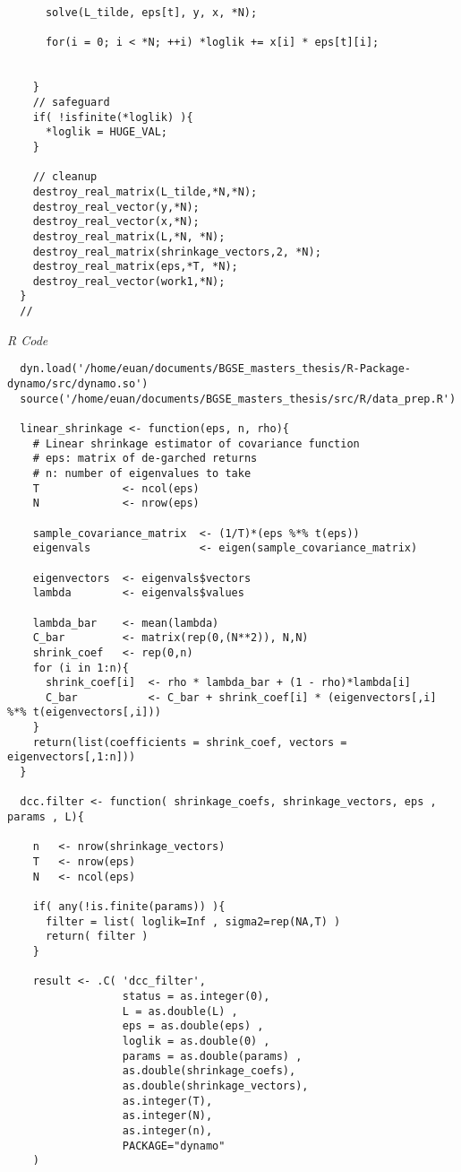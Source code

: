 \begin{lstlisting}
      solve(L_tilde, eps[t], y, x, *N);

      for(i = 0; i < *N; ++i) *loglik += x[i] * eps[t][i];


    }
    // safeguard
    if( !isfinite(*loglik) ){
      *loglik = HUGE_VAL;
    }

    // cleanup
    destroy_real_matrix(L_tilde,*N,*N);
    destroy_real_vector(y,*N);
    destroy_real_vector(x,*N);
    destroy_real_matrix(L,*N, *N);
    destroy_real_matrix(shrinkage_vectors,2, *N);
    destroy_real_matrix(eps,*T, *N);
    destroy_real_vector(work1,*N);
  }
  //
\end{lstlisting}

\emph{R Code}
\lstset{language=R}
\begin{lstlisting}
  dyn.load('/home/euan/documents/BGSE_masters_thesis/R-Package-dynamo/src/dynamo.so')
  source('/home/euan/documents/BGSE_masters_thesis/src/R/data_prep.R')

  linear_shrinkage <- function(eps, n, rho){
    # Linear shrinkage estimator of covariance function
    # eps: matrix of de-garched returns
    # n: number of eigenvalues to take
    T             <- ncol(eps)
    N             <- nrow(eps)

    sample_covariance_matrix  <- (1/T)*(eps %*% t(eps))
    eigenvals                 <- eigen(sample_covariance_matrix)

    eigenvectors  <- eigenvals$vectors
    lambda        <- eigenvals$values

    lambda_bar    <- mean(lambda)
    C_bar         <- matrix(rep(0,(N**2)), N,N)
    shrink_coef   <- rep(0,n)
    for (i in 1:n){
      shrink_coef[i]  <- rho * lambda_bar + (1 - rho)*lambda[i]
      C_bar           <- C_bar + shrink_coef[i] * (eigenvectors[,i] %*% t(eigenvectors[,i]))
    }
    return(list(coefficients = shrink_coef, vectors = eigenvectors[,1:n]))
  }

  dcc.filter <- function( shrinkage_coefs, shrinkage_vectors, eps , params , L){

    n   <- nrow(shrinkage_vectors)
    T   <- nrow(eps)
    N   <- ncol(eps)

    if( any(!is.finite(params)) ){
      filter = list( loglik=Inf , sigma2=rep(NA,T) )
      return( filter )
    }

    result <- .C( 'dcc_filter',
                  status = as.integer(0),
                  L = as.double(L) ,
                  eps = as.double(eps) ,
                  loglik = as.double(0) ,
                  params = as.double(params) ,
                  as.double(shrinkage_coefs),
                  as.double(shrinkage_vectors),
                  as.integer(T),
                  as.integer(N),
                  as.integer(n),
                  PACKAGE="dynamo"
    )


\end{lstlisting}

